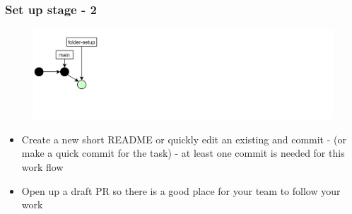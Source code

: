 \documentclass[aspectratio=169]{beamer} %
\begin{document}
\begin{frame}
	\frametitle{Set up stage - 2}

	\vspace{-.5cm}
	\begin{minipage}[t][5cm][t]{\textwidth}
		\begin{figure}
			\centering
			\includegraphics[width=\textwidth]{./img/dime-gitflow-network-1-1.png}
		\end{figure}
	\end{minipage}

	\vspace{-.5cm}
	\begin{minipage}[t][5cm][t]{\textwidth}
		\begin{itemize}
			\setlength\itemsep{.5em}
			\item Create a new short README or
			quickly edit an existing and commit -
			(or make a quick commit for the task) -
			at least one commit is needed for this work flow
			\item Open up a draft PR so there is a good place
			for your team to follow your work
		\end{itemize}
	\end{minipage}

\end{frame}
\end{document}
